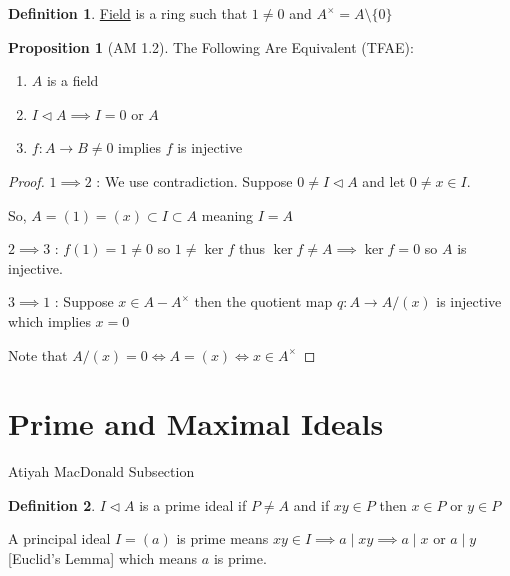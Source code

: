 \documentclass{article}
\theoremstyle{definition}
\newtheorem{definition}{Definition}
\newtheorem{proposition}{Proposition}
\begin{document}
\begin{definition}
    \underline{Field} is a ring such that \(1\neq 0\) and \(A^\times = A \setminus \{ 0 \} \) 
\end{definition}

\begin{proposition}
    [AM 1.2]

    The Following Are Equivalent (TFAE):

    \begin{enumerate}
        \item \(A\) is a field
        \item \(I\triangleleft A \implies I=0\) or \(A\) 
        \item \(f: A\to B \neq 0\) implies \(f\) is injective
    \end{enumerate}

\end{proposition}

\begin{proof}
    \(1 \implies 2\) : We use contradiction. Suppose \(0 \neq I \triangleleft A\) and let \(0 \neq x \in I\).

    So, \(A = (1) = (x) \subset I \subset A\) meaning \(I = A\) 

    \(2 \implies 3\) : \(f(1) = 1 \neq 0\) so \(1 \neq \ker f\) thus \(\ker f \neq A \implies \ker f=0\) so \(A \) is injective.

    \(3 \implies 1\) : Suppose \(x \in A - A^\times\) then the quotient map \(q : A \to A/(x)\) is injective which implies \(x = 0\) 
    
    Note that \(A / (x) = 0 \iff A = (x) \iff x\in A^\times\) 

\end{proof}

\section*{Prime and Maximal Ideals}

Atiyah MacDonald Subsection

\begin{definition}
    \(I \triangleleft A\) is a prime ideal if \(P \neq A\) and if \(xy\in P\) then \(x\in P\) or \(y\in P\)  
\end{definition}

A principal ideal \(I=(a)\) is prime means \(xy\in I \implies a\mid xy \implies a\mid x\) or \(a\mid y\) [Euclid's Lemma] which means \(a\) is prime.
\end{document}
